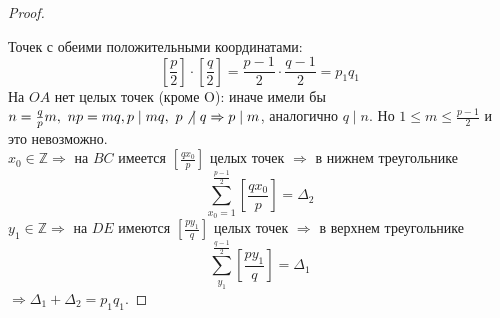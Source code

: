\documentclass[a4paper, 12pt]{article}
\newcommand{\Z}{\mathbb{Z}}
\renewcommand{\div}{\mid}
\theoremstyle{definition}
\begin{document}
\begin{proof}
\begin{center}
        \end{center}
        Точек с обеими положительными координатами: 
        \[[\frac{p}{2}]\cdot[\frac{q}{2}]=\frac{p-1}{2}\cdot \frac{q-1}{2}=p_1 q_1\] 
        На $OA$ нет целых точек (кроме O): иначе имели бы $n=\frac{q}{p}m,\ np=mq,\\
        p\div mq,\ p\not\hspace*{4pt}\div q \Rightarrow p\div m$, аналогично $q\div n$. Но $1\leq m\leq \frac{p-1}{2}$ и это невозможно.\\
        $x_0\in \Z \Rightarrow$ на $BC$ имеется $[\frac{qx_0}{p}]$ целых точек $\Rightarrow$ в нижнем треугольнике 
        \[\sum\limits_{x_0=1}^{\frac{p-1}{2}}[\frac{qx_0}{p}]=\Delta_2\]
        $y_1\in \Z \Rightarrow$ на $DE$ имеются $[\frac{py_1}{q}]$ целых точек $\Rightarrow$ в верхнем треугольнике 
        \[\sum\limits_{y_1}^{\frac{q-1}{2}}[\frac{py_1}{q}]=\Delta_1\]
        $\Rightarrow \Delta_1+\Delta_2=p_1 q_1$.  
    \end{proof} 
    \newpage
\end{document}
